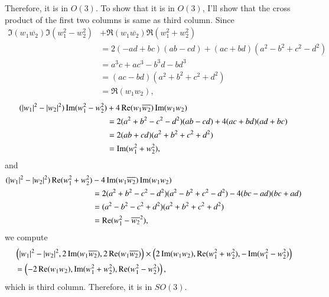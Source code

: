 \documentclass[a4paper, 12pt]{article}
\theoremstyle{Mydefinition}
\theoremstyle{Mytheorem}
\begin{document}
Therefore, it is in $O(3)$. To show that it is in $O(3)$, I'll show that the cross product of the first two columns is same as third column. Since
\begin{equation*}
\begin{split}
    \Im(w_1\overline{w_2})\Im(w_1^2-w_2^2) &+\Re(w_1\overline{w_2})\Re(w_1^2+w_2^2) \\
    &=2(-ad+bc)(ab-cd)+(ac+bd)(a^2-b^2+c^2-d^2)\\
    &= a^3 c + a c^3 - b^3 d - b d^3\\
    &=(ac-bd)(a^2+b^2+c^2+d^2)\\
    &=\Re(w_1w_2),
\end{split}
\end{equation*}
\begin{equation*}
\begin{split}
    (\abs{w_1}^2-\abs{w_2}^2)\Im(w_1^2-w_2^2)&+ 4\Re(w_1\overline{w_2})\Im(w_1w_2) \\
    &=2(a^2+b^2-c^2-d^2)(ab-cd) + 4(ac+bd)(ad+bc)\\
    &=2(ab+cd)(a^2+b^2+c^2+d^2)\\
    &=\Im(w_1^2+w_2^2),
\end{split}
\end{equation*}
and
\begin{equation*}
\begin{split}
    (\abs{w_1}^2-\abs{w_2}^2)\Re(w_1^2+w_2^2)& - 4\Im(w_1\overline{w_2})\Im(w_1w_2) \\
    &=2(a^2+b^2-c^2-d^2)(a^2-b^2+c^2-d^2) - 4(bc-ad)(bc+ad)\\
    &=(a^2-b^2-c^2+d^2)(a^2+b^2+c^2+d^2)\\
    &=\Re(w_1^2-\overline{w_2}^2),
\end{split}
\end{equation*}
we compute
\begin{equation*}
\begin{split}
    &\left(\abs{w_1}^2-\abs{w_2}^2, 2\Im(w_1\overline{w_2}), 2\Re(w_1\overline{w_2})\right)\times \left(2\Im(w_1w_2), \Re(w_1^2+w_2^2), -\Im(w_1^2-w_2^2)\right)\\
    &=\left(-2\Re(w_1w_2), \Im(w_1^2+w_2^2), \Re(w_1^2-w_2^2)\right),
\end{split}
\end{equation*}
which is third column. Therefore, it is in $\mathit{SO}(3)$.
\end{document}

